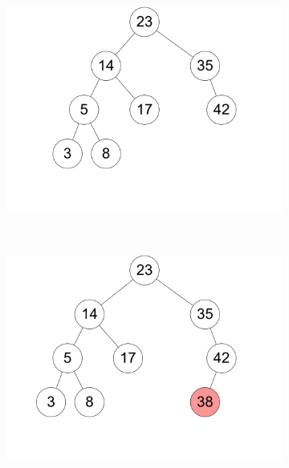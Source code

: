 \documentclass[11pt,a4paper]{article}
\begin{document}
\begin{loesung}
\begin{enumerate}
\begin{figure}[h!]
\begin{subfigure}[b]{0.23\textwidth}
                \centering
                \includegraphics[width=\textwidth]{img/3a_5}
                \caption*{}
            \end{subfigure}
            \\
            \begin{subfigure}[b]{0.23\textwidth}
                \centering
                \includegraphics[width=\textwidth]{img/3a_6}
                \caption*{}
            \end{subfigure}
            \begin{subfigure}[b]{0.23\textwidth}
                \centering

\end{subfigure}
\end{figure}
\end{enumerate}
\end{loesung}
\end{document}
